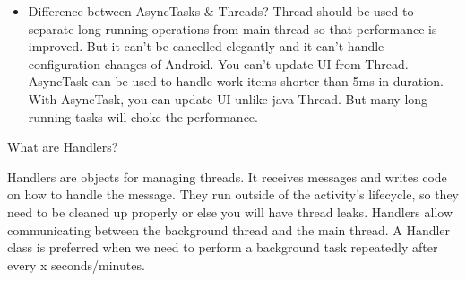 \documentclass[11pt]{article}
\begin{document}
\begin{itemize}
\begin{enumerate}
\begin{itemize}
\begin{itemize}
\item Difference between AsyncTasks \& Threads?
Thread should be used to separate long running operations from main thread so that performance is improved. But it can't be cancelled elegantly and it can't handle configuration changes of Android. You can't update UI from Thread.
AsyncTask can be used to handle work items shorter than 5ms in duration. With AsyncTask, you can update UI unlike java Thread. But many long running tasks will choke the performance.
\end{itemize}
\end{itemize}
\end{enumerate}
\end{itemize}

What are Handlers?

Handlers are objects for managing threads. It receives messages and writes code on how to handle the message. They run outside of the activity’s lifecycle, so they need to be cleaned up properly or else you will have thread leaks.
Handlers allow communicating between the background thread and the main thread.
A Handler class is preferred when we need to perform a background task repeatedly after every x seconds/minutes.
\end{document}
